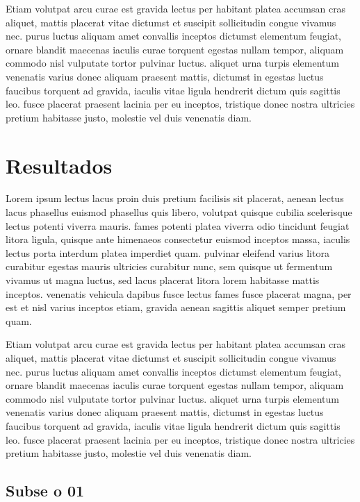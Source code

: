 \documentclass{article}
\begin{document}
Etiam volutpat arcu curae est gravida lectus per habitant platea accumsan cras aliquet, mattis placerat vitae dictumst et suscipit sollicitudin congue vivamus nec. purus luctus aliquam amet convallis inceptos dictumst elementum feugiat, ornare blandit maecenas iaculis curae torquent egestas nullam tempor, aliquam commodo nisl vulputate tortor pulvinar luctus. aliquet urna turpis elementum venenatis varius donec aliquam praesent mattis, dictumst in egestas luctus faucibus torquent ad gravida, iaculis vitae ligula hendrerit dictum quis sagittis leo. fusce placerat praesent lacinia per eu inceptos, tristique donec nostra ultricies pretium habitasse justo, molestie vel duis venenatis diam. 

\section{Resultados}

Lorem ipsum lectus lacus proin duis pretium facilisis sit placerat, aenean lectus lacus phasellus euismod phasellus quis libero, volutpat quisque cubilia scelerisque lectus potenti viverra mauris. fames potenti platea viverra odio tincidunt feugiat litora ligula, quisque ante himenaeos consectetur euismod inceptos massa, iaculis lectus porta interdum platea imperdiet quam. pulvinar eleifend varius litora curabitur egestas mauris ultricies curabitur nunc, sem quisque ut fermentum vivamus ut magna luctus, sed lacus placerat litora lorem habitasse mattis inceptos. venenatis vehicula dapibus fusce lectus fames fusce placerat magna, per est et nisl varius inceptos etiam, gravida aenean sagittis aliquet semper pretium quam. 

Etiam volutpat arcu curae est gravida lectus per habitant platea accumsan cras aliquet, mattis placerat vitae dictumst et suscipit sollicitudin congue vivamus nec. purus luctus aliquam amet convallis inceptos dictumst elementum feugiat, ornare blandit maecenas iaculis curae torquent egestas nullam tempor, aliquam commodo nisl vulputate tortor pulvinar luctus. aliquet urna turpis elementum venenatis varius donec aliquam praesent mattis, dictumst in egestas luctus faucibus torquent ad gravida, iaculis vitae ligula hendrerit dictum quis sagittis leo. fusce placerat praesent lacinia per eu inceptos, tristique donec nostra ultricies pretium habitasse justo, molestie vel duis venenatis diam. 

\subsection{Subse o 01}
\end{document}
